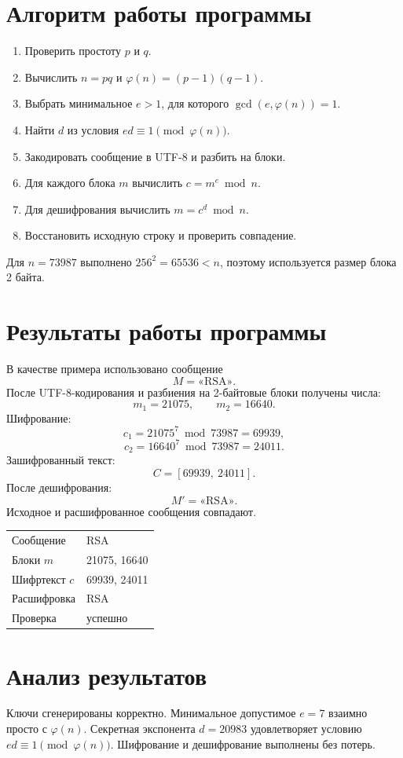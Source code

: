 \documentclass[12pt]{article}
\begin{document}
\section{Алгоритм работы программы}
\begin{enumerate}
    \item Проверить простоту \(p\) и \(q\).
    \item Вычислить \(n=pq\) и \(\varphi(n)=(p-1)(q-1)\).
    \item Выбрать минимальное \(e>1\), для которого \(\gcd(e,\varphi(n))=1\).
    \item Найти \(d\) из условия \(ed\equiv 1\pmod{\varphi(n)}\).
    \item Закодировать сообщение в UTF-8 и разбить на блоки.
    \item Для каждого блока \(m\) вычислить \(c=m^e\bmod n\).
    \item Для дешифрования вычислить \(m=c^d\bmod n\).
    \item Восстановить исходную строку и проверить совпадение.
\end{enumerate}

Для \(n=73987\) выполнено \(256^2=65536<n\), поэтому используется размер блока 2 байта.

\section{Результаты работы программы}
В качестве примера использовано сообщение
\[
M=\text{«RSA»}.
\]
После UTF-8-кодирования и разбиения на 2-байтовые блоки получены числа:
\[
m_1=21075,\qquad m_2=16640.
\]
Шифрование:
\[
c_1=21075^7\bmod 73987=69939,
\]
\[
c_2=16640^7\bmod 73987=24011.
\]
Зашифрованный текст:
\[
C=[69939,\ 24011].
\]
После дешифрования:
\[
M'=\text{«RSA»}.
\]
Исходное и расшифрованное сообщения совпадают.

\begin{center}
\begin{tabular}{ll}
\toprule
Сообщение & RSA \\
Блоки \(m\) & 21075, 16640 \\
Шифртекст \(c\) & 69939, 24011 \\
Расшифровка & RSA \\
Проверка & успешно \\
\bottomrule
\end{tabular}
\end{center}

\section{Анализ результатов}
Ключи сгенерированы корректно. Минимальное допустимое \(e=7\) взаимно просто с \(\varphi(n)\). Секретная экспонента \(d=20983\) удовлетворяет условию \(ed\equiv1\pmod{\varphi(n)}\). Шифрование и дешифрование выполнены без потерь.
\end{document}
